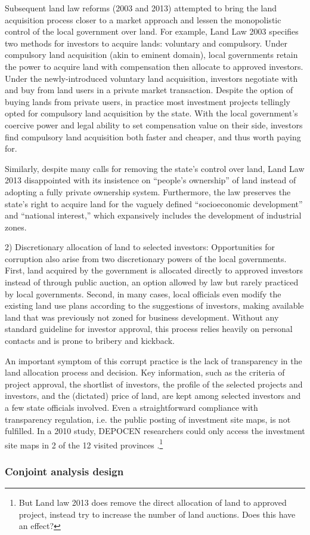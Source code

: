Subsequent land law reforms (2003 and 2013) attempted to bring the land acquisition process closer to a market approach and lessen the monopolistic control of the local government over land. For example, Land Law 2003 specifies two methods for investors to acquire lands: voluntary and compulsory. Under compulsory land acquisition (akin to eminent domain), local governments retain the power to acquire land with compensation then allocate to approved investors. Under the newly-introduced voluntary land acquisition, investors negotiate with and buy from land users in a private market transaction. Despite the option of buying lands from private users, in practice most investment projects tellingly opted for compulsory land acquisition by the state. With the local government's coercive power and legal ability to set compensation value on their side, investors find compulsory land acquisition both faster and cheaper, and thus worth paying for.

Similarly, despite many calls for removing the state's control over land, Land Law 2013 disappointed with its insistence on ``people's ownership'' of land instead of adopting a fully private ownership system. Furthermore, the law preserves the state's right to acquire land for the vaguely defined ``socioeconomic development'' and ``national interest,'' which expansively includes the development of industrial zones.

2) Discretionary allocation of land to selected investors: Opportunities for corruption also arise from two discretionary powers of the local governments. First, land acquired by the government is allocated directly to approved investors instead of through public auction, an option allowed by law but rarely practiced by local governments. Second, in many cases, local officials even modify the existing land use plans according to the suggestions of investors, making available land that was previously not zoned for business development. Without any standard guideline for investor approval, this process relies heavily on personal contacts and is prone to bribery and kickback.

An important symptom of this corrupt practice is the lack of transparency in the land allocation process and decision. Key information, such as the criteria of project approval, the shortlist of investors, the profile of the selected projects and investors, and the (dictated) price of land, are kept among selected investors and a few state officials involved. Even a straightforward compliance with transparency regulation, i.e. the public posting of investment site maps, is not fulfilled. In a 2010 study, DEPOCEN researchers could only access the investment site maps in 2 of the 12 visited provinces \citep{Anderson2011}.\footnote{But Land law 2013 does remove the direct allocation of land to approved project, instead try to increase the number of land auctions. Does this have an effect?}

\subsubsection{Conjoint analysis design}
